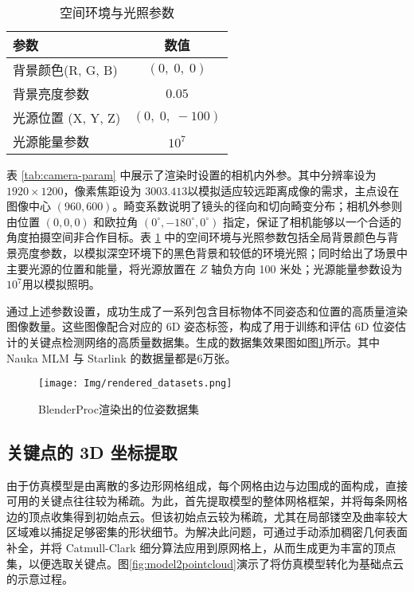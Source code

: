 \begin{table}[hbt]\centering
	\caption{空间环境与光照参数}
	\label{tab:env-param}
	\begin{tabular}{lc}
		\toprule[1.5pt]
		参数 & 数值 \\
		\midrule[1pt]
		背景颜色(R, G, B) 
		& $(0,\;0,\;0)$ \\
		背景亮度参数 
		& $0.05$ \\
		光源位置 (X, Y, Z)
		& $(0,\;0,\;-100)$ \\
		光源能量参数 
		& $10^7$ \\
		\bottomrule[1.5pt]
	\end{tabular}
\end{table}
\noindent


表 \ref{tab:camera-param} 中展示了渲染时设置的相机内外参。其中分辨率设为 $1920 \times 1200$，像素焦距设为 $3003.413$以模拟适应较远距离成像的需求，主点设在图像中心 $(960, 600)$。畸变系数说明了镜头的径向和切向畸变分布；相机外参则由位置 $(0,0,0)$ 和欧拉角 $(0^\circ,-180^\circ,0^\circ)$ 指定，保证了相机能够以一个合适的角度拍摄空间非合作目标。表 \ref{tab:env-param} 中的空间环境与光照参数包括全局背景颜色与背景亮度参数，以模拟深空环境下的黑色背景和较低的环境光照；同时给出了场景中主要光源的位置和能量，将光源放置在 $Z$ 轴负方向 100 米处；光源能量参数设为$10^7$用以模拟照明。

通过上述参数设置，成功生成了一系列包含目标物体不同姿态和位置的高质量渲染图像数量。这些图像配合对应的 6D 姿态标签，构成了用于训练和评估 6D 位姿估计的关键点检测网络的高质量数据集。生成的数据集效果图如图\ref{fig:rendered_datasets}所示。其中 Nauka MLM 与 Starlink 的数据量都是6万张。

\begin{figure}[htbp]
	\centering
	\texttt{[image: Img/rendered\_datasets.png]}
	\caption{BlenderProc渲染出的位姿数据集}
	\label{fig:rendered_datasets}
\end{figure}

\subsection{关键点的 3D 坐标提取}

由于仿真模型是由离散的多边形网格组成，每个网格由边与边围成的面构成，直接可用的关键点往往较为稀疏。为此，首先提取模型的整体网格框架，并将每条网格边的顶点收集得到初始点云。但该初始点云较为稀疏，尤其在局部镂空及曲率较大区域难以捕捉足够密集的形状细节。为解决此问题，可通过手动添加稠密几何表面补全，并将 Catmull-Clark 细分算法应用到原网格上，从而生成更为丰富的顶点集，以便选取关键点。图\ref{fig:model2pointcloud}演示了将仿真模型转化为基础点云的示意过程。

